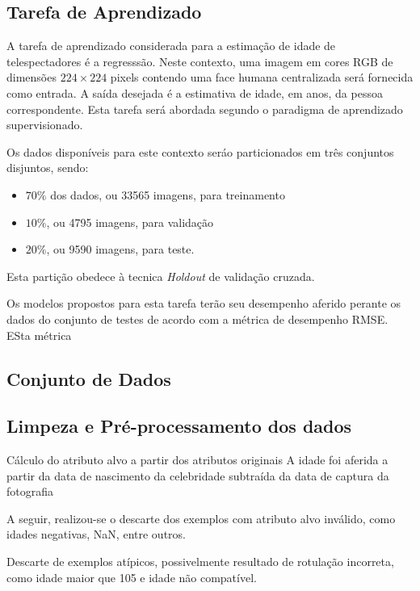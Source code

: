 
\subsection{Tarefa de Aprendizado}
A tarefa de aprendizado considerada para a estimação de idade de telespectadores é a regresssão. Neste contexto, uma imagem em cores RGB de dimensões $224 \times 224$ pixels contendo uma face humana centralizada será fornecida como entrada. A saída desejada é a estimativa de idade, em anos, da pessoa correspondente. Esta tarefa será abordada segundo o paradigma de aprendizado supervisionado.

Os dados disponíveis para este contexto seráo particionados em três conjuntos disjuntos, sendo:
\begin{itemize}
     \item $70\%$ dos dados, ou 33565 imagens, para treinamento
     \item $10\%$, ou 4795 imagens, para validação
     \item $20\%$, ou 9590 imagens, para teste.
\end{itemize}
Esta partição obedece à tecnica \emph{Holdout} de validação cruzada.

Os modelos propostos para esta tarefa terão seu desempenho aferido perante os dados do conjunto de testes de acordo com a métrica de desempenho RMSE. ESta métrica 

\subsection{Conjunto de Dados}


\subsection{Limpeza e Pré-processamento dos dados}
Cálculo do atributo alvo a partir dos atributos originais
A idade foi aferida a partir da data de nascimento da celebridade subtraída da data de captura da fotografia

A seguir, realizou-se o descarte dos exemplos com atributo alvo inválido, como idades negativas, NaN, entre outros.

Descarte de exemplos atípicos, possivelmente resultado de rotulação incorreta, como idade maior que 105 e idade não compatível. 

